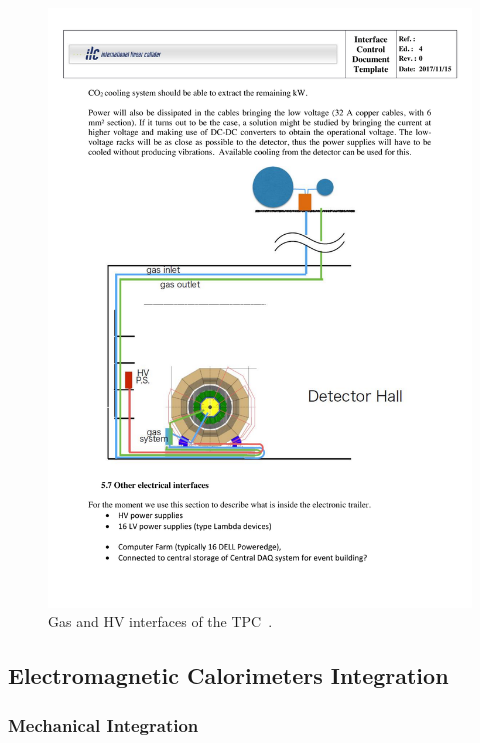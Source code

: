 \begin{figure}[h!]
    \centering
    \includegraphics[width=1.0\hsize]{Integration/fig/TPC_Interfaces.pdf}
    \caption{Gas and HV interfaces of the TPC~\cite{ild:bib:TPC_ICD}.}
    \label{ILD:fig:tpc_interfaces}
\end{figure}


\subsection{Electromagnetic Calorimeters Integration}

\subsubsection{Mechanical Integration}

